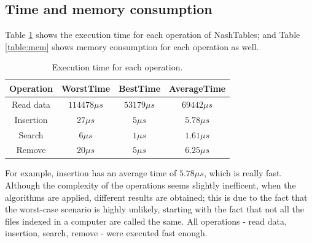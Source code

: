 \documentclass{sig-alternate-05-2015}
\begin{document}
  \subsection{Time and memory consumption}
  Table \ref{tab:exTime} shows the execution time for each operation of NashTables; and Table \ref{table:mem} shows
  memory consumption for each operation as well.
  \begin{table}
    \small
    \centering
    \caption{Execution time for each operation.}
    \label{tab:exTime}
    \begin{tabular}{cccc}
      \hline
      \textbf{Operation} & \textbf{WorstTime} & 	\textbf{BestTime} & \textbf{AverageTime} \\ \hline
      Read data          & $114478\mu s$      & $53179\mu s$      & $69442\mu s$         \\
      Insertion          & $27\mu s$               & $5\mu s$               & $5.78\mu s$               \\
      Search             & $6\mu s$               & $1\mu s$              & $1.61\mu s$               \\
      Remove             & $20\mu s$              & $5\mu s$              & $6.25\mu s$              \\ \hline
    \end{tabular}
  \end{table}
  For example, insertion has an average time of $5.78\mu s$, which is really fast. Although the complexity of the operations
  seems slightly inefficent, when the algorithms are applied, different results are obtained; this is due to the fact that
  the worst-case scenario is highly unlikely, starting with the fact that not all the files indexed in a computer are called the
  same. All operations - read data, insertion, search, remove - were executed fast enough.



  
  
\end{document}
